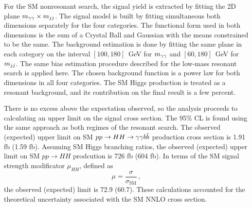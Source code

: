 For the SM nonresonant search, the signal yield is extracted by fitting the 2D plane
$m_{\gamma\gamma} \times m_{jj}$. The signal model is built by fitting simultaneous both dimensions separately
for the four categories. The functional form used in both dimensions is the sum of a Crystal Ball and
Gaussian with the means constrained to be the same. The background estimation is done by fitting
the same plane in each category on the interval $[100, 180]$~GeV for $m_{\gamma\gamma}$ and $[60, 180]$~GeV
for $m_{jj}$. The same bias estimation procedure
described for the low-mass resonant search is applied here. The chosen background function is a power
law for both dimensions in all four categories. The SM Higgs production is treated as a resonant
background, and its contribution on the final result is a few percent.

There is no excess above the expectation observed, so the analysis proceeds to calculating an
upper limit on the signal cross section. The 95\% CL is found using the same approach as both
regimes of the resonant search. The observed (expected) upper limit on SM
$pp \rightarrow HH \rightarrow \gamma\gamma b\bar{b}$ production cross section is 1.91 fb (1.59 fb).
Assuming SM Higgs branching ratios, the observed (expected) upper limit on SM $pp \rightarrow HH$
prodcution is 726 fb (604 fb). In terms of the SM signal strength modificator $\mu_{HH}$, defined as
\begin{equation}
\mu = \frac{\sigma}{\sigma_\text{SM}} \, ,
\end{equation}
the observed (expected) limit is 72.9 (60.7). These calculations accounted for the theoretical
uncertainty associated with the SM NNLO cross section.


